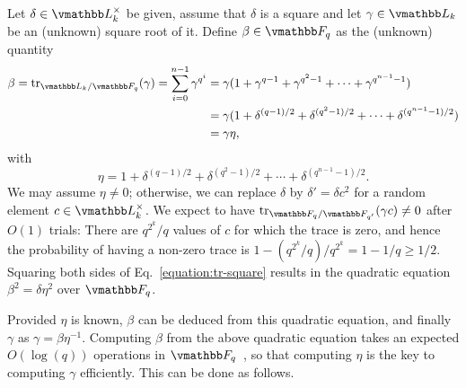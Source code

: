Let $\delta \in \L_k^\times$ be given, assume that $\delta$ is a
square and let $\gamma \in \L_k$ be an (unknown) square root of
it. Define $\beta \in \F_q$ as the (unknown) quantity
\begin{equation}
\label{equation:tr-square}
\begin{aligned}
\beta = \trace_{\L_k / \F_q}(\gamma) = \sum_{i = 0}^{n - 1} \gamma^{q^i}
& = \gamma(1 + \gamma^{q - 1} + \gamma^{q^2 - 1} + \cdots + \gamma^{q^{n - 1} -1}) \\
& = \gamma(1 + \delta^{(q - 1) / 2} + \delta^{(q^2 - 1) / 2} + \cdots + \delta^{(q^{n - 1} -1) / 2})\\
& = \gamma \eta,
\end{aligned}
\end{equation}
with
$$\eta = 1 + \delta^{(q - 1) / 2} + \delta^{(q^2 - 1) / 2} + \cdots +
\delta^{(q^{n - 1} -1) / 2}.$$ We may assume $\eta \ne 0$; otherwise,
we can replace $\delta$ by $\delta' = \delta c^2$ for a random element
$c \in \L_k^\times$. We expect to have $\trace_{\F_q / \F_{q'}}(\gamma c) \ne 0$ 
after $O(1)$ trials: There are $q^{2^k} / q$ values of $c$ for which the trace is zero, 
and hence the probability of having a non-zero trace is $1 - (q^{2^k} / q) / q^{2^k} = 1 - 1/q
\ge 1/2$. Squaring both sides of Eq.~\eqref{equation:tr-square}
results in the quadratic equation $\beta^2 = \delta \eta^2$ over
$\F_q$.

Provided $\eta$ is known, $\beta$ can be deduced from this quadratic
equation, and finally $\gamma$ as $\gamma=\beta \eta^{-1}$.  Computing
$\beta$ from the above quadratic equation takes an expected
$O(\log(q))$ operations in $\F_q$~\cite[Ch.\ 14.5]{GaGe03}, so that
computing $\eta$ is the key to computing $\gamma$ efficiently. This
can be done as follows.


